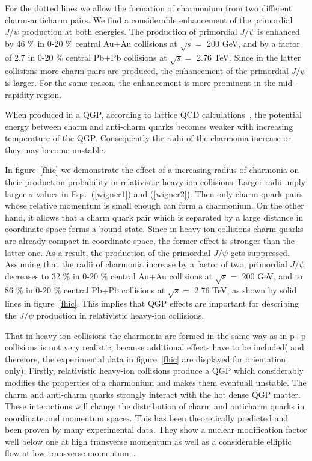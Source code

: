 \documentclass[twocolumn,aps,superscriptaddress,showpacs,nofootinbib,floatfix]{revtex4}
\begin{document}
For the dotted lines we allow the formation of charmonium from two different charm-anticharm  pairs.
We find a considerable enhancement of the primordial $J/\psi$  production at both energies.
The production of primordial $J/\psi$ is enhanced by 46 \% in 0-20 \% central Au+Au collisions at $\sqrt{s}=$ 200 GeV, and by a factor of 2.7 in 0-20 \% central Pb+Pb collisions at $\sqrt{s}=$ 2.76 TeV. Since  in the latter collisions more charm pairs are produced, the enhancement of the primordial $J/\psi$ is larger. For the same reason, the enhancement is more prominent in the mid-rapidity region.

When produced in a QGP, according to lattice QCD calculations~\cite{Kaczmarek:2003ph}, the potential energy between charm and anti-charm quarks becomes weaker with increasing temperature of the QGP. Consequently the radii of the charmonia increase or they may become unstable.

In figure~\ref{fhic} we demonstrate the effect of a increasing radius of charmonia on their production probability in relativistic heavy-ion collisions. Larger radii imply larger $\sigma$ values in Eqs.~(\ref{wigner1}) and (\ref{wigner2}). Then only charm quark pairs whose relative momentum is small enough can form a charmonium. On the other hand, it allows that a charm quark pair which is separated by a large distance in coordinate space forms a bound state. Since in heavy-ion collisions charm quarks are already compact in coordinate space, the former effect is stronger than the latter one.
As a result, the production of the primordial $J/\psi$ gets suppressed. Assuming that the radii of charmonia increase by a factor of two, primordial $J/\psi$ decreases to 32 \% in 0-20 \% central Au+Au collisions at $\sqrt{s}=$ 200 GeV, and to 86 \% in 0-20 \% central Pb+Pb collisions at $\sqrt{s}=$ 2.76 TeV, as shown by solid lines in figure~\ref{fhic}.
This implies that QGP effects are important for describing the $J/\psi$ production in relativistic heavy-ion collisions.

That in heavy ion collisions the charmonia are formed in the same way as in p+p collisions is not very realistic, because additional
effects have to be included( and therefore, the experimental data in figure~\ref{fhic} are displayed for orientation only):
Firstly, relativistic heavy-ion collisions produce a QGP which considerably modifies the properties of a charmonium and makes them eventuall unstable. The charm and anti-charm quarks strongly interact with the hot dense QGP matter.
These interactions will change the distribution of charm and anticharm quarks in coordinate and momentum spaces.
This has been theoretically predicted and been proven by many experimental data. They show a nuclear modification factor well below one at high transverse momentum as well as a considerable elliptic flow at low transverse momentum~\cite{Adamczyk:2014uip,Tlusty:2012ix,Adam:2015sza,Abelev:2014ipa,Adare:2006nq,Adare:2014rly}.
\end{document}
